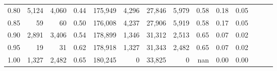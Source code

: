 \begin{tabular}{rrrrrrrrrrrrrr}
0.80 &   5,124 &  4,060 &  0.44 &  175,949 &    4,296 &  27,846 &   5,979 &  0.58 &  0.18 &      0.05 \\
0.85 &      59 &     60 &  0.50 &  176,008 &    4,237 &  27,906 &   5,919 &  0.58 &  0.17 &      0.05 \\
0.90 &   2,891 &  3,406 &  0.54 &  178,899 &    1,346 &  31,312 &   2,513 &  0.65 &  0.07 &      0.02 \\
0.95 &      19 &     31 &  0.62 &  178,918 &    1,327 &  31,343 &   2,482 &  0.65 &  0.07 &      0.02 \\
1.00 &   1,327 &  2,482 &  0.65 &  180,245 &        0 &  33,825 &       0 &   nan &  0.00 &      0.00 \\
\bottomrule
\end{tabular}

